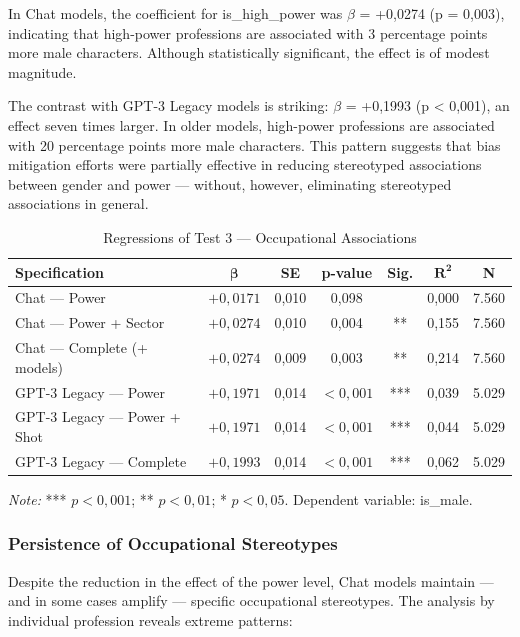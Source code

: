 \documentclass[12pt,a4paper]{article}
\begin{document}
In Chat models, the coefficient for is\_high\_power was $\beta$ = +0,0274 (p =
0,003), indicating that high-power professions are associated with 3
percentage points more male characters. Although statistically
significant, the effect is of modest magnitude.

The contrast with GPT-3 Legacy models is striking: $\beta$ = +0,1993 (p <
0,001), an effect seven times larger. In older models, high-power professions are associated with 20 percentage points more male
characters. This pattern suggests that bias mitigation efforts
were partially effective in reducing stereotyped associations between
gender and power --- without, however, eliminating stereotyped associations in
general.

\begin{table}[H]
\centering
\caption{Regressions of Test 3 --- Occupational Associations}
\label{tab:reg-teste3}
\begin{tabular}{lcccccc}
\toprule
\textbf{Specification} & $\boldsymbol{\beta}$ & \textbf{SE} & \textbf{p-value} & \textbf{Sig.} & $\boldsymbol{R^2}$ & \textbf{N} \\
\midrule
Chat --- Power & $+0,0171$ & 0,010 & 0,098 & & 0,000 & 7.560 \\
Chat --- Power + Sector & $+0,0274$ & 0,010 & 0,004 & ** & 0,155 & 7.560 \\
Chat --- Complete (+ models) & $+0,0274$ & 0,009 & 0,003 & ** & 0,214 & 7.560 \\
GPT-3 Legacy --- Power & $+0,1971$ & 0,014 & $<0,001$ & *** & 0,039 & 5.029 \\
GPT-3 Legacy --- Power + Shot & $+0,1971$ & 0,014 & $<0,001$ & *** & 0,044 & 5.029 \\
GPT-3 Legacy --- Complete & $+0,1993$ & 0,014 & $<0,001$ & *** & 0,062 & 5.029 \\
\bottomrule
\end{tabular}

\smallskip
\footnotesize\textit{Note:} *** $p < 0,001$; ** $p < 0,01$; * $p < 0,05$. Dependent variable: is\_male.
\end{table}
\subsubsection{Persistence of Occupational Stereotypes}


Despite the reduction in the effect of the power level, Chat models maintain
--- and in some cases amplify --- specific occupational stereotypes.
The analysis by individual profession reveals extreme patterns:
\end{document}
